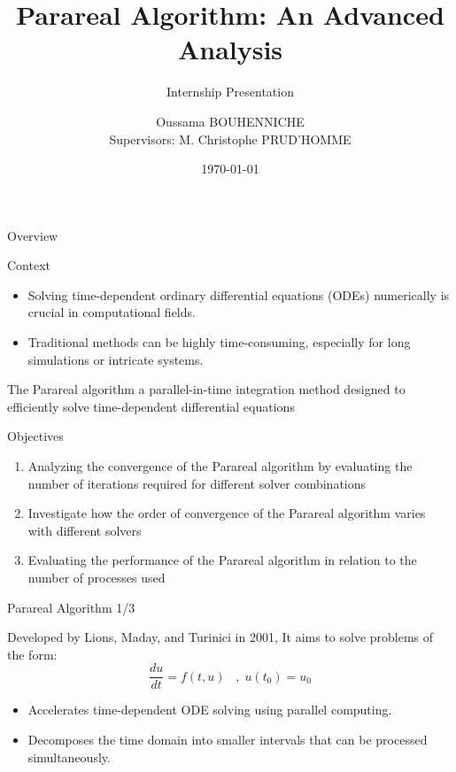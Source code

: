 \documentclass[aspectratio=169,xcolor=dvipsnames, t]{beamer}
\title[Parareal Algorithm]{Parareal Algorithm: An Advanced Analysis}
\subtitle{Internship Presentation}
\author[O. BOUHENNICHE]{Oussama BOUHENNICHE \\[2mm]{\small Supervisors: M. Christophe PRUD’HOMME}}
\institute[]{University of Strasbourg\\[1mm]{\small Cemosis}}
\date{\today} %
\begin{document}
\maketitlepage

\begin{frame}[t]{Overview}
    \tableofcontents
\end{frame}


\begin{frame}{Context}
    \begin{itemize}
        \item Solving time-dependent ordinary differential equations (ODEs) numerically is crucial in computational fields.
        \item Traditional methods can be highly time-consuming, especially for long simulations or intricate systems.
    \end{itemize}
\begin{block}{}
    The Parareal algorithm  a parallel-in-time integration method designed to efficiently solve time-dependent differential equations
\end{block}
\end{frame}

\begin{frame}{Objectives}
    \begin{enumerate}
        \item Analyzing the convergence of the Parareal algorithm by evaluating the number of iterations required for different solver combinations
        \item Investigate how the order of convergence of the Parareal algorithm varies with different solvers
        \item Evaluating the performance of the Parareal algorithm in relation to the number of processes used
    \end{enumerate}
\end{frame}


\begin{frame}{Parareal Algorithm 1/3}
    \begin{block}{}
    Developed by Lions, Maday, and Turinici in 2001, It aims to solve problems of the form:
    $$
    \frac{du}{dt} = f(t,u) \;\;\;,\; u(t_0) = u_0
    $$
    \begin{itemize}
        \item Accelerates time-dependent ODE solving using parallel computing.
        \item Decomposes the time domain into smaller intervals that can be processed simultaneously.
    \end{itemize}
\end{block}
\end{frame}
\end{document}
